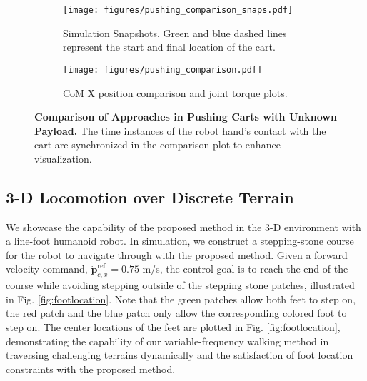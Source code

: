 \begin{figure}[!t]
\vspace{0.2cm}
     \centering
     \begin{subfigure}[b]{0.5\textwidth}
         \centering
	   \texttt{[image: figures/pushing\_comparison\_snaps.pdf]}
          \caption{Simulation Snapshots. Green and blue dashed lines represent the start and final location of the cart.}
          \vspace{0.2cm}
          \label{fig:comppush1}
     \end{subfigure}
     \begin{subfigure}[b]{0.475\textwidth}
        \texttt{[image: figures/pushing\_comparison.pdf]}
	\caption{CoM X position comparison and joint torque plots.}
        \vspace{0.2cm}
	\label{fig:comppush2}
     \end{subfigure}
     \caption{{\bfseries Comparison of Approaches in Pushing Carts with Unknown Payload.} The time instances of the robot hand's contact with the cart are synchronized in the comparison plot to enhance visualization.}
    \label{fig:compare_pushing}
    \vspace{-0.2cm}
\end{figure}

\subsection{3-D Locomotion over Discrete Terrain}
\label{subsec:discrete_terrain}

We showcase the capability of the proposed method in the 3-D environment with a line-foot humanoid robot. In simulation, we construct a stepping-stone course for the robot to navigate through with the proposed method. Given a forward velocity command, $\dot {\bm p}^\text{ref}_{c,x} = 0.75$ m/s, the control goal is to reach the end of the course while avoiding stepping outside of the stepping stone patches, illustrated in Fig. \ref{fig:footlocation}. Note that the green patches allow both feet to step on, the red patch and the blue patch only allow the corresponding colored foot to step on. The center locations of the feet are plotted in Fig. \ref{fig:footlocation}, demonstrating the capability of our variable-frequency walking method in traversing challenging terrains dynamically and the satisfaction of foot location constraints with the proposed method.

